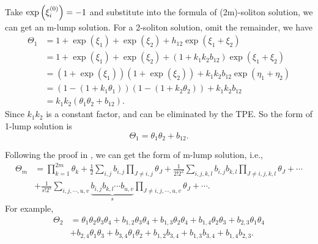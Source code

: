 Take $\exp\left(\xi_i^{(0)}\right)=-1$ and substitute  into the formula of (2m)-soliton solution, we can get an m-lump solution. For a 2-soliton solution, omit the remainder, we have
\begin{equation}
\begin{split}
\Theta_1&=1+\exp(\xi_1)+\exp(\xi_2)+h_{12}\exp(\xi_1+\xi_2) \\ 
&= 1+\exp(\xi_1)+\exp(\xi_2)+(1+k_1k_2b_{12})\exp(\xi_1+\xi_2) \\ 
&=(1+\exp(\xi_1))(1+\exp(\xi_2))+k_1k_2b_{12}\exp(\eta_1+\eta_2) \\ 
&=(1-(1+k_1\theta_1))(1-(1+k_2\theta_2))+k_1k_2b_{12} \\
&=k_1k_2(\theta_1\theta_2+b_{12}).
\end{split}
\end{equation}
Since $k_1k_2$ is a constant factor, and can be eliminated by the TPE. So the form of 1-lump solution is 
\begin{equation}
    \Theta_1=\theta_1\theta_2+b_{12}.
\end{equation}

Following the proof in \cite{satsuma1979two}, we can get the form of m-lump solution, i.e.,
\begin{equation}
\begin{split}
    \Theta_m&=\prod_{k=1}^{2m}\theta_k+\frac{1}{2}\sum_{i,j}{b_{i,j}}\prod_{J\neq i,j}{\theta_J}+\frac{1}{2! 2^2}\sum_{i,j,k,l}{b_{i,j}b_{k,l}}\prod_{J\neq i,j,k,l}{\theta_{J}}+\cdots \\
    &+\frac{1}{s!2^s}\sum_{i,j,\cdots,u,v}\underbrace{{b_{i,j}b_{k,l}\cdots b_{u,v}}}_{s}\prod_{J\neq i,j,\cdots, u,v}{\theta_J}+\cdots. \label{f-lump-old}
\end{split}
\end{equation}
For example,
\begin{equation}
\renewcommand{\t}[1]{\theta_{#1}}
\renewcommand{\b}[1]{b_{#1}}
\begin{split}
\Theta_2&=\t{1}\t{2}\t{3}\t{4}+\b{1,2}\t{3}\t{4}+\b{1,3}\t{2}\t{4}+\b{1,4}\t{2}\t{3}+\b{2,3}\t{1}\t{4}\\
&+\b{2,4}\t{1}\t{3}+\b{3,4}\t{1}\t{2}+\b{1,2}\b{3,4}+\b{1,3}\b{3,4}+\b{1,4}\b{2,3}.
\end{split}
\end{equation}

